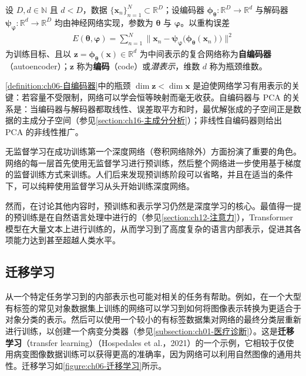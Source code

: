 \documentclass[../../main.tex]{subfiles}
\begin{document}
\begin{definition}[自编码器]\label{definition:ch06-自编码器}
设 $D,d\in\mathbb{N}$ 且 $d<D$，数据 $\{\boldsymbol{x}_{n}\}_{n=1}^{N}\subset\mathbb{R}^{D}$；设编码器 $\boldsymbol{\phi}_{\boldsymbol{\theta}}:\mathbb{R}^{D}\to\mathbb{R}^{d}$ 与解码器 $\boldsymbol{\psi}_{\boldsymbol{\varphi}}:\mathbb{R}^{d}\to\mathbb{R}^{D}$ 均由神经网络实现，参数为 $\boldsymbol{\theta}$ 与 $\boldsymbol{\varphi}$。以重构误差
\begin{align}
E(\boldsymbol{\theta},\boldsymbol{\varphi})=\sum_{n=1}^{N}\bigl\|\boldsymbol{x}_n-\boldsymbol{\psi}_{\boldsymbol{\varphi}}\bigl(\boldsymbol{\phi}_{\boldsymbol{\theta}}(\boldsymbol{x}_n)\bigr)\bigr\|^{2}
\label{align:ch06-自编码器}
\end{align}
为训练目标、且以 $\boldsymbol{z}=\boldsymbol{\phi}_{\boldsymbol{\theta}}(\boldsymbol{x})\in\mathbb{R}^{d}$ 为中间表示的复合网络称为\textbf{自编码器}（autoencoder）；$\boldsymbol{z}$ 称为\textbf{编码}（code）或\emph{潜表示}，维数 $d$ 称为瓶颈维数。
\end{definition}

\begin{remark}\cref{definition:ch06-自编码器}中的瓶颈 $\dim\boldsymbol{z}<\dim\boldsymbol{x}$ 是迫使网络学习有用表示的关键：若容量不受限制，网络可以学会恒等映射而毫无收获。自编码器与 PCA 的关系是：当编码器与解码器都取线性、误差取平方和时，最优解张成的子空间正是数据的主成分子空间（参见\cref{section:ch16-主成分分析}）；非线性自编码器则给出 PCA 的非线性推广。
\end{remark}

无监督学习在成功训练第一个深度网络（卷积网络除外）方面扮演了重要的角色。网络的每一层首先使用无监督学习进行预训练，然后整个网络进一步使用基于梯度的监督训练方式来训练。人们后来发现预训练阶段可以省略，并且在适当的条件下，可以纯粹使用监督学习从头开始训练深度网络。

然而，在讨论其他内容时，预训练和表示学习仍然是深度学习的核心。最值得一提的预训练是在自然语言处理中进行的（参见\cref{section:ch12-注意力}），Transformer 模型在大量文本上进行训练的，从而学习到了高度复杂的语言内部表示，促进其各项能力达到甚至超越人类水平。

\subsection{迁移学习}\label{subsection:ch06-迁移学习}

从一个特定任务学习到的内部表示也可能对相关的任务有帮助。例如，在一个大型有标签的常见对象数据集上训练的网络可以学习到如何将图像表示转换为更适合于对象分类的表示。然后可以使用一个较小的有标签数据集对网络的最终分类层重新进行训练，以创建一个病变分类器（参见\cref{subsection:ch01-医疗诊断}）。这是\textbf{迁移学习}（transfer learning）（Hospedales et al.，2021）的一个示例，它相较于仅使用病变图像数据训练可以获得更高的准确率，因为网络可以利用自然图像的通用共性。迁移学习如\cref{figure:ch06-迁移学习}所示。
\end{document}
